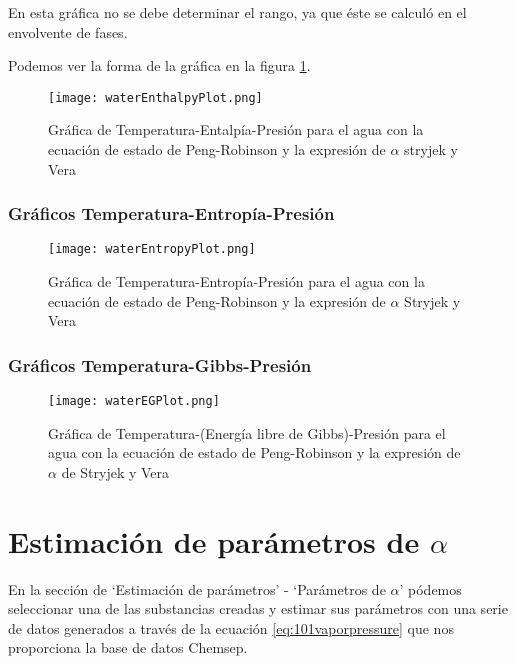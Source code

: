 		En esta gráfica no se debe determinar el rango, ya que éste se calculó en el envolvente de fases.

		Podemos ver la forma de la gráfica en la figura \ref{fig:hplot}.

		\begin{figure}[H]
			\texttt{[image: waterEnthalpyPlot.png]}
			\caption{Gráfica de Temperatura-Entalpía-Presión para el agua con la ecuación de estado de Peng-Robinson y la expresión de $\alpha$ stryjek y Vera}
			\label{fig:hplot}
		\end{figure}
	\subsubsection{Gráficos Temperatura-Entropía-Presión}\label{subsec:tsp}	
		\begin{figure}[H]
			\texttt{[image: waterEntropyPlot.png]}
			\caption{Gráfica de Temperatura-Entropía-Presión para el agua con la ecuación de estado de Peng-Robinson y la expresión de $\alpha$ Stryjek y Vera}
			\label{fig:splot}
		\end{figure}
	\subsubsection{Gráficos Temperatura-Gibbs-Presión}\label{subsec:tgp}
		\begin{figure}[H]
			\texttt{[image: waterEGPlot.png]}
			\caption{Gráfica de Temperatura-(Energía libre de Gibbs)-Presión para el agua con la ecuación de estado de Peng-Robinson y la expresión de $\alpha$ de Stryjek y Vera}
			\label{gplot}
		\end{figure}
	
	
\section{Estimación de parámetros de $\alpha$}\label{sec:webAlphaOptim}
	En la sección de `Estimación de parámetros' - `Parámetros de $\alpha$' pódemos seleccionar una de las substancias creadas y estimar sus parámetros con una serie de datos generados a través de la ecuación \ref{eq:101vaporpressure} que nos proporciona la base de datos Chemsep.

